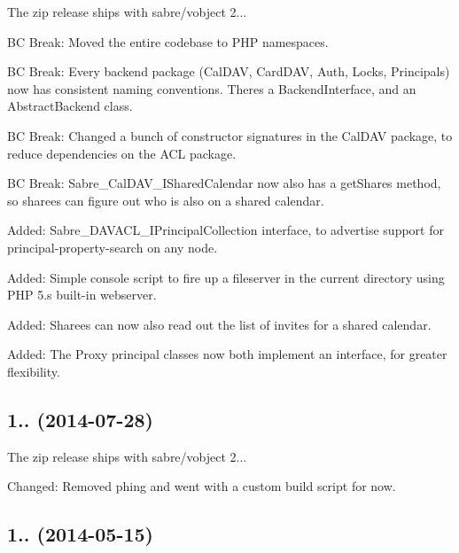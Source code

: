 \begin{DoxyItemize}
\item The zip release ships with sabre/vobject 2...
\item BC Break\+: Moved the entire codebase to P\+HP namespaces.
\item BC Break\+: Every backend package (Cal\+D\+AV, Card\+D\+AV, Auth, Locks, Principals) now has consistent naming conventions. There\textquotesingle{}s a Backend\+Interface, and an Abstract\+Backend class.
\item BC Break\+: Changed a bunch of constructor signatures in the Cal\+D\+AV package, to reduce dependencies on the A\+CL package.
\item BC Break\+: Sabre\+\_\+\+Cal\+D\+A\+V\+\_\+\+I\+Shared\+Calendar now also has a get\+Shares method, so sharees can figure out who is also on a shared calendar.
\item Added\+: Sabre\+\_\+\+D\+A\+V\+A\+C\+L\+\_\+\+I\+Principal\+Collection interface, to advertise support for principal-\/property-\/search on any node.
\item Added\+: Simple console script to fire up a fileserver in the current directory using P\+HP 5.\textquotesingle{}s built-\/in webserver.
\item Added\+: Sharee\textquotesingle{}s can now also read out the list of invites for a shared calendar.
\item Added\+: The Proxy principal classes now both implement an interface, for greater flexibility.
\end{DoxyItemize}

\subsection*{1.. (2014-\/07-\/28) }


\begin{DoxyItemize}
\item The zip release ships with sabre/vobject 2...
\item Changed\+: Removed phing and went with a custom build script for now.
\end{DoxyItemize}

\subsection*{1.. (2014-\/05-\/15) }


